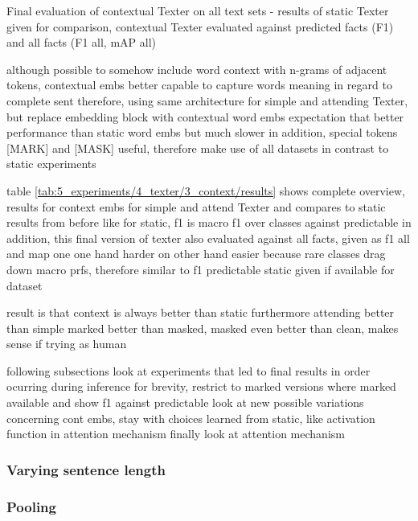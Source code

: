 \begin{table}
    \centering
    
    \caption{Final evaluation of contextual Texter on all text sets - results of static Texter given for comparison, contextual Texter evaluated against predicted facts (F1) and all facts (F1 all, mAP all)}
    \label{tab:5_experiments/4_texter/3_context/results}
\end{table}

although possible to somehow include word context with n-grams of adjacent tokens, contextual embs better capable to capture words meaning in regard to complete sent
therefore, using same architecture for simple and attending Texter, but replace embedding block with contextual word embs
expectation that better performance than static word embs
but much slower
in addition, special tokens [MARK] and [MASK] useful, therefore make use of all datasets in contrast to static experiments

table \ref{tab:5_experiments/4_texter/3_context/results} shows complete overview, results for context embs for simple and attend Texter and compares to static results from before
like for static, f1 is macro f1 over classes against predictable
in addition, this final version of texter also evaluated against all facts, given as f1 all and map
one one hand harder on other hand easier because rare classes drag down macro prfs, therefore similar to f1 predictable
static given if available for dataset


result is that context is always better than static
furthermore attending better than simple
marked better than masked, masked even better than clean, makes sense if trying as human

following subsections look at experiments that led to final results in order ocurring during inference
for brevity, restrict to marked versions where marked available and show f1 against predictable
look at new possible variations concerning cont embs, stay with choices learned from static, like activation function in attention mechanism
finally look at attention mechanism

\subsubsection{Varying sentence length}
\label{subsubsec:5_experiments/4_texter/3_context/1_sent_len}


\subsubsection{Pooling}
\label{subsubsec:5_experiments/4_texter/3_context/2_pooling}


